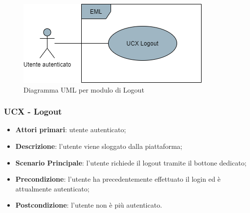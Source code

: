 \begin{figure}[H]
\centering
\includegraphics[scale=0.6]{res/UseCase/Immagini/Logout}
\caption{Diagramma UML per modulo di Logout}
\end{figure}

\subsubsection{UCX - Logout}
\begin{itemize}
\item \textbf{Attori primari}: utente autenticato;
\item \textbf{Descrizione}: l'utente viene sloggato dalla piattaforma;
\item \textbf{Scenario Principale}: l'utente richiede il logout tramite il bottone dedicato;
\item \textbf{Precondizione}: l'utente ha precedentemente effettuato il login ed è attualmente autenticato;
\item \textbf{Postcondizione}: l'utente non è più autenticato.
\end{itemize}